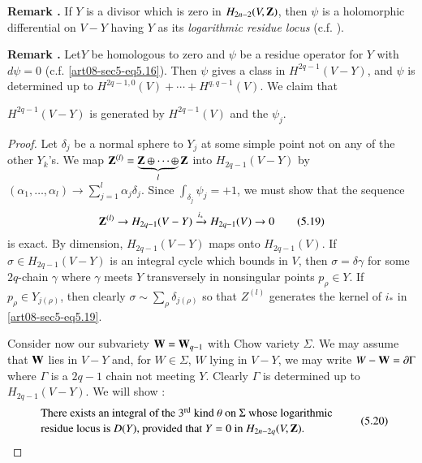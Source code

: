 \medskip
\noindent
{\bf Remark .\label{art08-sec5-rem5.17}}
If $Y$ is a divisor which is zero in $H_{2n-2}(V,\mathbf{Z})$, then $\psi$ is a holomorphic differential on $V-Y$ having $Y$ as its {\em logarithmic residue locus} (c.f. \cite{art08-key18}).

\medskip
\noindent
{\bf Remark .\label{art08-sec5-rem5.18}}
Let\pageoriginale $Y$ be homologous to zero and $\psi$ be a residue operator for $Y$ with $d\psi=0$ (c.f. \eqref{art08-sec5-eq5.16}). Then $\psi$ gives a class in $H^{2q-1}(V-Y)$, and $\psi$ is determined up to $H^{2q-1,0}(V)+\cdots+H^{q,q-1}(V)$. We claim that

$H^{2q-1}(V-Y)$ is generated by $H^{2q-1}(V)$ and the $\psi_{j}$.

\begin{proof}
Let $\delta_{j}$ be a normal sphere to $Y_{j}$ at some simple point not on any of the other $Y_{k}$'s. We map $\mathbf{Z}^{(l)}=\underbrace{\mathbf{Z}\oplus\cdots\oplus}_{l}\mathbf{Z}$ into $H_{2q-1}(V-Y)$ by $(\alpha_{1},\ldots,\alpha_{l})\to \sum\limits^{l}_{j=1}\alpha_{j}\delta_{j}$. Since $\int_{\delta_{j}}\psi_{j}=+1$, we must show that the sequence
\begin{equation*}
\mathbf{Z}^{(l)}\to H_{2q-1}(V-Y)\xrightarrow{i_{*}}H_{2q-1}(V)\to 0\tag{5.19}\label{art08-sec5-eq5.19}
\end{equation*}
is exact. By dimension, $H_{2q-1}(V-Y)$ maps onto $H_{2q-1}(V)$. If $\sigma\in H_{2q-1}(V-Y)$ is an integral cycle which bounds in $V$, then $\sigma=\delta \gamma$ for some $2q$-chain $\gamma$ where $\gamma$ meets $Y$ transversely in nonsingular points $p_{\rho}\in Y$. If $p_{\rho}\in Y_{j(\rho)}$, then clearly $\sigma\sim \sum\limits_{\rho}\delta_{j(\rho)}$ so that $Z^{(l)}$ generates the kernel of $i_{*}$ in \eqref{art08-sec5-eq5.19}.

Consider now our subvariety $\mathbf{W}=\mathbf{W}_{q-1}$ with Chow variety $\Sigma$. We may assume that $\mathbf{W}$ lies in $V-Y$ and, for $W\in \Sigma$, $W$ lying in $V-Y$, we may write $W-\mathbf{W}=\partial\Gamma$ where $\Gamma$ is a $2q-1$ chain not meeting $Y$. Clearly $\Gamma$ is determined up to $H_{2q-1}(V-Y)$. We will show :
\begin{equation*}
\begin{array}{l}
\text{There exists an integral of the $3^{\text{rd}}$ kind $\theta$ on $\Sigma$ whose logarithmic}\\[2pt]
\text{residue locus is $D(Y)$, provided that $Y=0$ in $H_{2n-2q}(V,\mathbf{Z})$.}
\end{array}\tag{5.20}\label{art08-sec5-eq5.20}
\end{equation*}
\end{proof}

